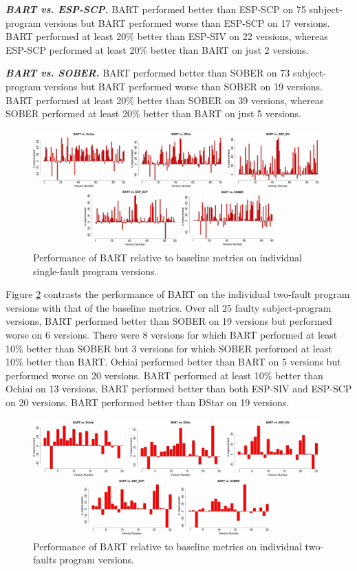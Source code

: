 \textit{\textbf{ BART vs. ESP-SCP.}}  BART performed better than ESP-SCP on 75 subject-program versions but BART performed worse than ESP-SCP on 17 versions.  BART performed at least 20\% better than ESP-SIV on 22 versions, whereas ESP-SCP performed at least 20\% better than BART on just 2 versions.

\textit{\textbf{ BART vs. SOBER.}}  BART performed better than SOBER on 73 subject-program versions but BART performed worse than SOBER on 19 versions.  BART performed at least 20\% better than SOBER on 39 versions, whereas SOBER performed at least 20\% better than BART on just 5 versions.

\begin{figure}
\centering
\includegraphics[width=\textwidth]{chapter4_BART_VS_Base.pdf}
\caption{Performance of BART relative to baseline metrics on individual single-fault program versions.}
\label{BART_VS_Base}
\end{figure}

Figure \ref{BART_VS_Base_M} contrasts the performance of BART on the individual two-fault program versions with that of the baseline metrics.  Over all 25 faulty subject-program versions, BART performed better than SOBER on 19 versions but performed worse on 6 versions.  There were 8 versions for which BART performed at least 10\% better than SOBER but 3 versions for which SOBER performed at least 10\% better than BART.  Ochiai performed better than BART on 5 versions but performed worse on 20 versions. BART performed at least 10\% better than Ochiai on 13 versions. BART performed better than both ESP-SIV and ESP-SCP on 20 versions.   BART performed better than DStar on 19 versions.

\begin{figure}
\centering
\includegraphics[width=\textwidth]{chapter4_BARTvsBase_M.pdf}
\caption{Performance of BART relative to baseline metrics on individual two-faults program versions.}
\label{BART_VS_Base_M}
\end{figure}


